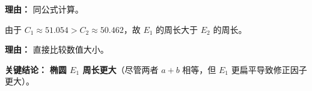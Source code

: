 \begin{examplebox}
\begin{description}[style=nextline, leftmargin=2.8em, labelsep=0.5em, itemsep=0.45em]
		      \par\textbf{理由：} 同公式计算。

		\item[\textbf{第三步（比较大小）：}]
		      由于 $C_1\approx51.054 > C_2\approx50.462$，故 $E_1$ 的周长大于 $E_2$ 的周长。

		      \par\textbf{理由：} 直接比较数值大小。
	\end{description}

	\textbf{\textcolor{CExample}{关键结论：}} \textbf{椭圆 $E_1$ 周长更大}（尽管两者 $a+b$ 相等，但 $E_1$ 更扁平导致修正因子更大）。
\end{examplebox}